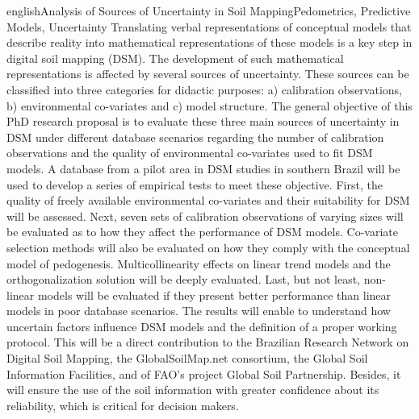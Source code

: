 \documentclass[tese]{UFRuralRJ}
\begin{document}
\def\tituloingles{Analysis of Sources of Uncertainty in Soil Mapping}
\def\chavesingles{Pedometrics, Predictive Models, Uncertainty}
\generalabstracttrue
\begin{generalabstract}{english}{\tituloingles}{\chavesingles}
Translating verbal representations of conceptual models that describe reality 
into mathematical representations of these models is a key step in digital soil 
mapping (DSM). The development of such mathematical representations is affected 
by several sources of uncertainty. These sources can be classified into three 
categories for didactic purposes: a) calibration observations, b) environmental
co-variates and c) model structure. The general objective of this PhD research 
proposal is to evaluate these three main sources of uncertainty in DSM under 
different database scenarios regarding the number of calibration observations 
and the quality of environmental co-variates used to fit DSM models. A database 
from a pilot area in DSM studies in southern Brazil will be used to develop a 
series of empirical tests to meet these objective. First, the quality of freely 
available environmental co-variates and their suitability for DSM will be 
assessed. Next, seven sets of calibration observations of varying sizes will be 
evaluated as to how they affect the performance of DSM models. Co-variate 
selection methods will also be evaluated on how they comply with the conceptual 
model of pedogenesis. Multicollinearity effects on linear trend models and the 
orthogonalization solution will be deeply evaluated. Last, but not least, 
non-linear models will be evaluated if they present better performance than 
linear models in poor database scenarios. The results will enable to understand 
how uncertain factors influence DSM models and the definition of a proper 
working protocol. This will be a direct contribution to the Brazilian Research 
Network on Digital Soil Mapping, the GlobalSoilMap.net consortium, the Global 
Soil Information Facilities, and of FAO's project Global Soil Partnership. 
Besides, it will ensure the use of the soil information with greater confidence 
about its reliability, which is critical for decision makers.
\end{generalabstract}

\end{document}
